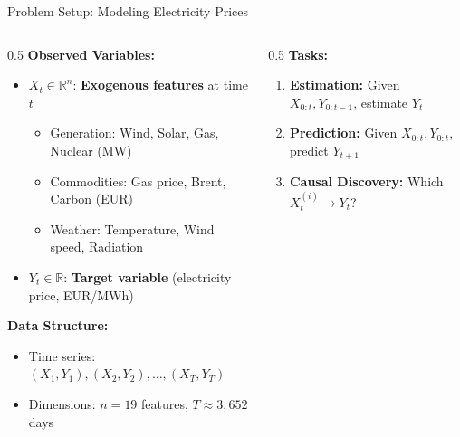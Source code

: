 \documentclass[aspectratio=169]{beamer}
\begin{document}
\begin{frame}{Problem Setup: Modeling Electricity Prices}
\begin{columns}
\begin{column}{0.5\textwidth}
\textbf{Observed Variables:}
\begin{itemize}
    \item $X_t \in \mathbb{R}^{n}$: \textbf{Exogenous features} at time $t$
    \begin{itemize}
        \scriptsize
        \item Generation: Wind, Solar, Gas, Nuclear (MW)
        \item Commodities: Gas price, Brent, Carbon (EUR)
        \item Weather: Temperature, Wind speed, Radiation
    \end{itemize}
    \item $Y_t \in \mathbb{R}$: \textbf{Target variable} (electricity price, EUR/MWh)
\end{itemize}

\vspace{0.2cm}
\textbf{Data Structure:}
\begin{itemize}
    \item Time series: $(X_1, Y_1), (X_2, Y_2), \ldots, (X_T, Y_T)$
    \item Dimensions: $n = 19$ features, $T \approx 3{,}652$ days
\end{itemize}
\end{column}

\begin{column}{0.5\textwidth}
\textbf{Tasks:}
\begin{enumerate}
    \item \textbf{Estimation:} Given $X_{0:t}, Y_{0:t-1}$, estimate $Y_t$
    \item \textbf{Prediction:} Given $X_{0:t}, Y_{0:t}$, predict $Y_{t+1}$
    \item \textbf{Causal Discovery:} Which $X_t^{(i)} \rightarrow Y_t$?
\end{enumerate}

\vspace{0.3cm}
\begin{center}
\end{center}
\end{column}
\end{columns}
\end{frame}
\end{document}

